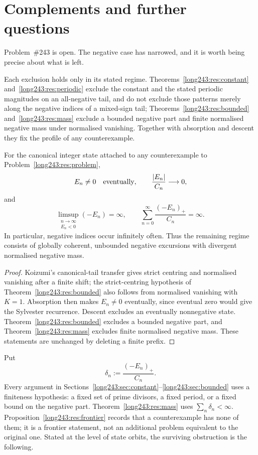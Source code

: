 \documentclass[11pt]{article}
\begin{document}
\section{Complements and further questions}\label{long243:sec:open}

Problem~\#243 is open.  The negative case has narrowed, and it is worth being
precise about what is left.

Each exclusion holds only in its stated regime.  Theorems~\ref{long243:res:constant}
and~\ref{long243:res:periodic} exclude the constant and the stated periodic magnitudes
on an all-negative tail, and do not exclude those patterns merely along the
negative indices of a mixed-sign tail; Theorems~\ref{long243:res:bounded}
and~\ref{long243:res:mass} exclude a bounded negative part and finite normalised
negative mass under normalised vanishing.  Together with absorption and descent
they fix the profile of any counterexample.

\begin{proposition}\label{long243:res:frontier}
For the canonical integer state attached to any counterexample to
Problem~\ref{long243:res:problem},
\[
 E_n\ne0\quad\hbox{eventually},\qquad
 \frac{|E_n|}{C_n}\longrightarrow0,
\]
and
\[
 \limsup_{\substack{n\to\infty\\E_n<0}}(-E_n)=\infty,
 \qquad
 \sum_{n=0}^{\infty}\frac{(-E_n)_+}{C_n}=\infty .
\]
In particular, negative indices occur infinitely often.  Thus the remaining
regime consists of globally coherent, unbounded negative excursions with
divergent normalised negative mass.
\end{proposition}

\begin{proof}
Koizumi's canonical-tail transfer gives strict centring and normalised
vanishing after a finite shift; the strict-centring hypothesis of
Theorem~\ref{long243:res:bounded} also follows from normalised vanishing with $K=1$.
Absorption then makes $E_n\ne0$ eventually,
since eventual zero would give the Sylvester recurrence.  Descent excludes an
eventually nonnegative state.  Theorem~\ref{long243:res:bounded} excludes a bounded
negative part, and Theorem~\ref{long243:res:mass} excludes finite normalised negative
mass.  These statements are unchanged by deleting a finite prefix.
\end{proof}

Put
\[
 \delta_n:=\frac{(-E_n)_+}{C_n}.
\]
Every argument in Sections~\ref{long243:sec:constant}--\ref{long243:sec:bounded} uses a
finiteness hypothesis: a fixed set of prime divisors, a fixed period, or a
fixed bound on the negative part.  Theorem~\ref{long243:res:mass} uses
$\sum_n\delta_n<\infty$.  Proposition~\ref{long243:res:frontier} records that a
counterexample has none of them; it is a frontier statement, not an additional
problem equivalent to the original one.  Stated at the level of state orbits,
the surviving obstruction is the following.
\end{document}
